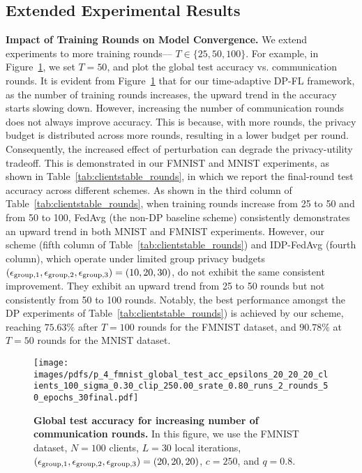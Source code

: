 {\subsection{Extended Experimental Results} \label{app:extendedresults}
\textbf{Impact of Training Rounds on Model Convergence.} We extend experiments to more training rounds--- $T\in \{25, 50, 100\}$. For example, in Figure~\ref{fig:morerounds}, we set $T=50$, and plot the global test accuracy vs. communication rounds.
It is evident from Figure~\ref{fig:morerounds} that for our time-adaptive DP-FL framework, as the number of training rounds increases, the upward trend in the accuracy starts slowing down. 
{However, increasing the number of communication rounds does not always improve accuracy. This is because, with more rounds, the privacy budget is distributed across more rounds, resulting in a lower budget per round. Consequently, the increased effect of perturbation can degrade the privacy-utility tradeoff. This is demonstrated in our FMNIST and MNIST experiments, as shown in Table~\ref{tab:clientstable_rounds}, in which we report the final-round test accuracy across different schemes. As shown in the third column of Table~\ref{tab:clientstable_rounds}, when training rounds increase from 25 to 50 and from 50 to 100, FedAvg (the non-DP baseline scheme) consistently demonstrates an upward trend in both MNIST and FMNIST experiments. However, our scheme (fifth column of Table~\ref{tab:clientstable_rounds}) and IDP-FedAvg (fourth column), which operate under limited group privacy budgets $({\epsilon}_{\text{group},1}, {\epsilon}_{\text{group},2}, {\epsilon}_{\text{group},3})=(10, 20, 30)$, do not exhibit the same consistent improvement. They exhibit an upward trend from 25 to 50 rounds but not consistently from 50 to 100 rounds. Notably, the best performance amongst the DP experiments of Table~\ref{tab:clientstable_rounds}) is achieved by our scheme, reaching $75.63\%$ after $T=100$ rounds for the FMNIST dataset, and $90.78\%$ at $T=50$ rounds for the MNIST dataset.}


\begin{figure}[!ht]
    \centering
    \vspace{5pt}  
        \centering
        \texttt{[image: images/pdfs/p\_4\_fmnist\_global\_test\_acc\_epsilons\_20\_20\_20\_clients\_100\_sigma\_0.30\_clip\_250.00\_srate\_0.80\_runs\_2\_rounds\_50\_epochs\_30final.pdf]} 
        \caption{\textbf{Global test accuracy for increasing number of communication rounds.} In this figure, we use the FMNIST dataset, $N=100$ clients, $L=30$ local iterations, $({\epsilon}_{\text{group},1}, {\epsilon}_{\text{group},2}, {\epsilon}_{\text{group},3})=(20, 20, 20)$, $c=250$, and $q=0.8$.} 
        \label{fig:morerounds}  
\end{figure}

}
